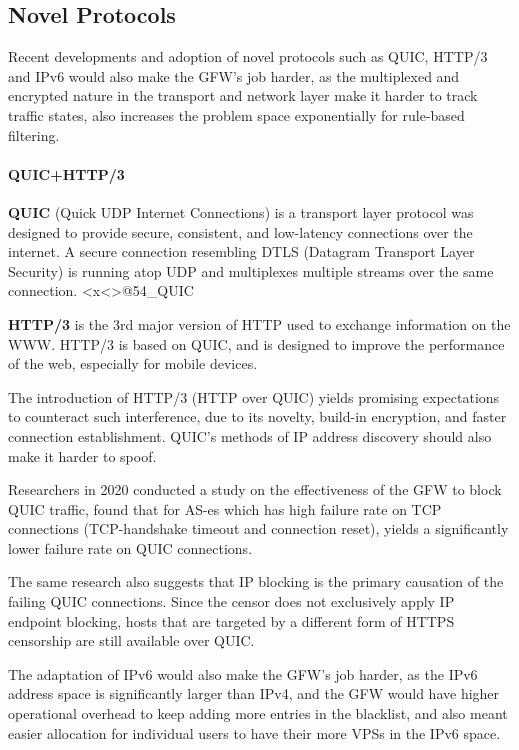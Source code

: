 \documentclass[nonacm,sigplan,screen]{acmart}
\begin{document}
\hypertarget{novel-protocols}{%
\subsection{Novel Protocols}\label{novel-protocols}}

Recent developments and adoption of novel protocols such as QUIC, HTTP/3
and IPv6 would also make the GFW's job harder, as the multiplexed and
encrypted nature in the transport and network layer make it harder to
track traffic states, also increases the problem space exponentially for
rule-based filtering.

\hypertarget{quichttp3}{%
\paragraph{QUIC+HTTP/3}\label{quichttp3}}

\textbf{QUIC} (Quick UDP Internet Connections) is a transport layer
protocol was designed to provide secure, consistent, and low-latency
connections over the internet. A secure connection resembling DTLS
(Datagram Transport Layer Security) is running atop UDP and multiplexes
multiple streams over the same connection.
\textless x\textless\textgreater{}@54\_QUIC

\textbf{HTTP/3} is the 3rd major version of HTTP used to exchange
information on the WWW. HTTP/3 is based on QUIC, and is designed to
improve the performance of the web, especially for mobile devices.
\cite{55_HTTP3}

The introduction of HTTP/3 (HTTP over QUIC) yields promising
expectations to counteract such interference, due to its novelty,
build-in encryption, and faster connection establishment. QUIC's methods
of IP address discovery should also make it harder to spoof.

Researchers in 2020 conducted a study on the effectiveness of the GFW to
block QUIC traffic, found that for AS-es which has high failure rate on
TCP connections (TCP-handshake timeout and connection reset), yields a
significantly lower failure rate on QUIC connections.
\cite{53_quicCensor}

The same research also suggests that IP blocking is the primary
causation of the failing QUIC connections. Since the censor does not
exclusively apply IP endpoint blocking, hosts that are targeted by a
different form of HTTPS censorship are still available over QUIC.

The adaptation of IPv6 would also make the GFW's job harder, as the IPv6
address space is significantly larger than IPv4, and the GFW would have
higher operational overhead to keep adding more entries in the
blacklist, and also meant easier allocation for individual users to have
their more VPSs in the IPv6 space.
\end{document}
